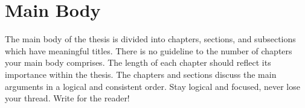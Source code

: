 \chapter{Main Body} 

The main body of the thesis is divided into chapters, sections, and subsections which have
meaningful titles. There is no guideline to the number of chapters your main body
comprises. The length of each chapter should reflect its importance within the thesis.
The chapters and sections discuss the main arguments in a logical and consistent order.
Stay logical and focused, never lose your thread. Write for the reader!
